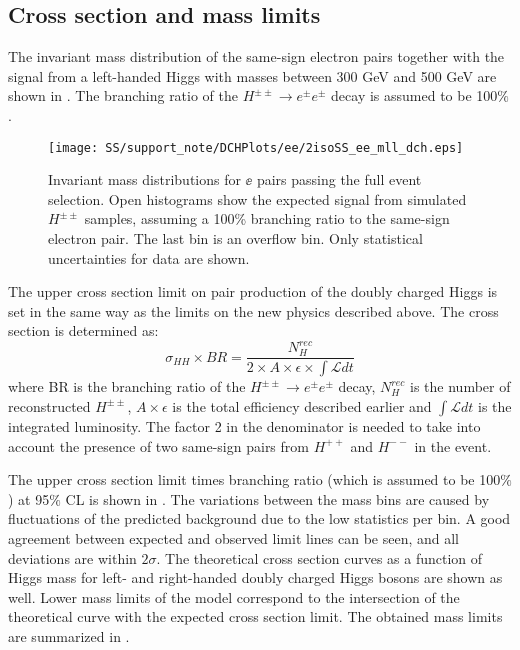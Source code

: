 
\subsection{Cross section and mass limits}

The invariant mass distribution of the same-sign electron pairs together with the signal from a left-handed Higgs 
with masses between 300 GeV and 500 GeV are shown in .
The branching ratio of the $H^{\pm\pm} \to e^{\pm}e^{\pm}$ decay is assumed to be 100$\%$.

\begin{figure}[h]
\begin{center}
\texttt{[image: SS/support\_note/DCHPlots/ee/2isoSS\_ee\_mll\_dch.eps]}
\caption{Invariant mass distributions for $\ee$ pairs passing the full event selection. 
Open histograms show the expected signal from simulated $H^{\pm\pm}$ samples,
assuming a 100\% branching ratio to the same-sign electron pair. The last bin is an overflow bin. Only statistical uncertainties for data are shown.}
\label{fig:signal_mass_v2}
\end{center}
\end{figure}

The upper cross section limit on pair production of the doubly charged Higgs is set in the same way as the limits on the new physics described above.
The cross section is determined as:
\begin{equation}
 \sigma_{HH}\times BR =\frac{N_{H}^{rec}}{2\times A\times \epsilon \times \int \mathscr{L} dt}
\end{equation}
where BR is the branching ratio of the $H^{\pm\pm} \to e^{\pm}e^{\pm}$ decay, 
$N_{H}^{rec}$ is the number of reconstructed $H^{\pm\pm}$, $A\times \epsilon$ is the total efficiency described earlier and
$\int \mathscr{L} dt$ is the integrated luminosity.
The factor 2 in the denominator is needed to take into account the presence of two same-sign pairs from $H^{++}$ and $H^{--}$ in the event.

The upper cross section limit times branching ratio (which is assumed to be 100$\%$) at 95$\%$ CL is shown in .
The variations between the mass bins are caused by fluctuations of the predicted background due to the low statistics per bin.
A good agreement between expected and observed limit lines can be seen, and all deviations are within $2\sigma$.
The theoretical cross section curves as a function of Higgs mass for left- and right-handed doubly charged Higgs bosons 
are shown as well.
Lower mass limits of the model correspond to the intersection of the theoretical curve with the expected cross section limit. The obtained
mass limits are summarized in .

